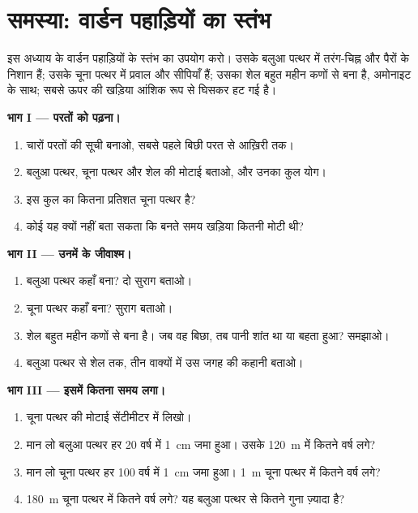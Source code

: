 \section{समस्या: वार्डन पहाड़ियों का स्तंभ}

\begin{problem}
\label{pb:g7:sediments-and-fossils:1}
इस अध्याय के वार्डन पहाड़ियों के स्तंभ का उपयोग करो। उसके बलुआ पत्थर में तरंग-चिह्न
और पैरों के निशान हैं; उसके चूना पत्थर में प्रवाल और सीपियाँ हैं; उसका शेल बहुत
महीन कणों से बना है, अमोनाइट के साथ; सबसे ऊपर की खड़िया आंशिक रूप से घिसकर हट
गई है।

\medskip
\noindent\textbf{भाग I --- परतों को पढ़ना।}\par\nopagebreak
\begin{enumerate}[beginpenalty=10000]
  \item चारों परतों की सूची बनाओ, सबसे पहले बिछी परत से आख़िरी तक।
  \item बलुआ पत्थर, चूना पत्थर और शेल की मोटाई बताओ, और उनका
        कुल योग।
  \item इस कुल का कितना प्रतिशत चूना पत्थर है?
  \item कोई यह क्यों नहीं बता सकता कि बनते समय खड़िया कितनी मोटी थी?
\end{enumerate}

\medskip
\noindent\textbf{भाग II --- उनमें के जीवाश्म।}\par\nopagebreak
\begin{enumerate}[resume, beginpenalty=10000]
  \item बलुआ पत्थर कहाँ बना? दो सुराग बताओ।
  \item चूना पत्थर कहाँ बना? सुराग बताओ।
  \item शेल बहुत महीन कणों से बना है। जब वह बिछा, तब पानी शांत था या बहता हुआ?
        समझाओ।
  \item बलुआ पत्थर से शेल तक, तीन वाक्यों में उस जगह की कहानी
        बताओ।
\end{enumerate}

\medskip
\noindent\textbf{भाग III --- इसमें कितना समय लगा।}\par\nopagebreak
\begin{enumerate}[resume, beginpenalty=10000]
  \item चूना पत्थर की मोटाई सेंटीमीटर में लिखो।
  \item मान लो बलुआ पत्थर हर 20 वर्ष में \qty{1}{cm} जमा हुआ। उसके \qty{120}{m} में
        कितने वर्ष लगे?
  \item मान लो चूना पत्थर हर 100 वर्ष में \qty{1}{cm} जमा हुआ।
        \qty{1}{m} चूना पत्थर में कितने वर्ष लगे?
  \item \qty{180}{m} चूना पत्थर में कितने वर्ष लगे? यह बलुआ पत्थर से कितने गुना
        ज़्यादा है?
\end{enumerate}
\end{problem}
